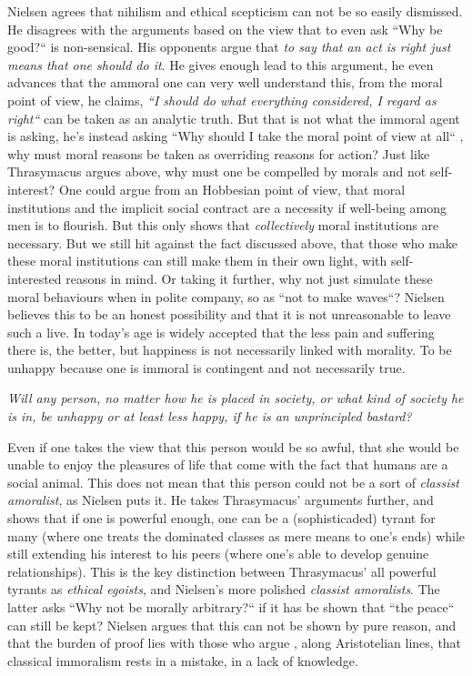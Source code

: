 \documentclass[english,course]{Notes}
\newcommand{\ita}[1]{\textit{#1}}
\newcommand\quo[1]{\begin{displayquote}\ita{\large{#1}}\end{displayquote}}
\begin{document}
\par{Nielsen agrees that nihilism and ethical scepticism can not be so easily dismissed. He disagrees with the arguments based on the view that to even ask ``Why be good?`` is non-sensical. His opponents argue that \ita{to say that an act is right just means that one should do it}. He gives enough lead to this argument, he even advances that the ammoral one can very well understand this, from the moral point of view, he claims, \ita{``I should do what everything considered, I regard as right``} can be taken as an analytic truth. But that is not what the immoral agent is asking, he's instead asking ``Why should I take the moral point of view at all`` , why must moral reasons be taken as overriding reasons for action? Just like Thrasymacus argues above, why must one be compelled by morals and not self-interest? One could argue from an Hobbesian point of view, that moral institutions and the implicit social contract are a necessity if well-being among men is to flourish.   But this only shows that \ita{collectively} moral institutions are necessary. But we still hit against the fact discussed above, that those who make these moral institutions can still make them in their own light, with self-interested reasons in mind. Or taking it further, why not just simulate these moral behaviours when in polite company, so as ``not to make waves``? Nielsen believes this to be an honest possibility and that it is not unreasonable to leave such a live. In today's age is widely accepted that the less pain and suffering there is, the better, but happiness is not necessarily linked with morality. To be unhappy because one is immoral is contingent and not necessarily true.}

\quo{Will any person, no matter how he is placed in society, or what kind of society he is in, be unhappy or at least less happy, if he is an unprincipled bastard?}

Even if one takes the view that this person would be so awful, that she would be unable to enjoy the pleasures of life that come with the fact that humans are a social animal. This does not mean that this person could not be a sort of \ita{classist amoralist}, as Nielsen puts it. He takes Thrasymacus' arguments further, and shows that if one is powerful enough, one can be a (sophisticaded) tyrant for many (where one treats the dominated classes as mere means to one's ends) while still extending his interest to his peers (where one's able to develop genuine relationships). This is the key distinction between Thrasymacus' all powerful tyrants as \ita{ethical egoists}, and Nielsen's more polished \ita{classist amoralists}. The latter asks ``Why not be morally arbitrary?`` if it has be shown that ``the peace`` can still be kept? Nielsen argues that this can not be shown by pure reason, and that the burden of proof lies with those who argue , along Aristotelian lines, that classical immoralism rests in a mistake, in a lack of knowledge.
\end{document}
